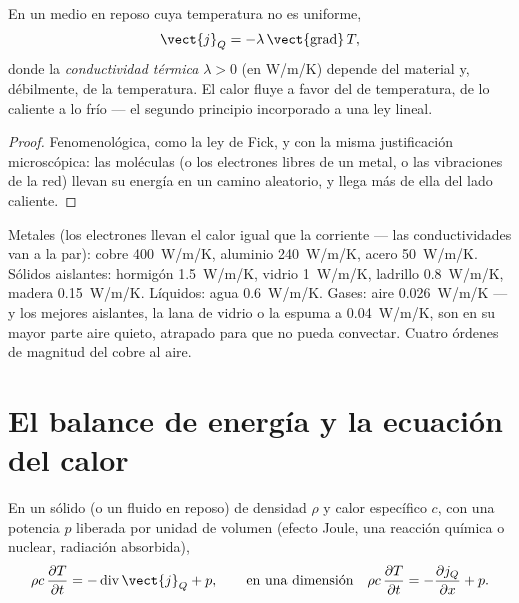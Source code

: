 \begin{theorem}\label{thm:b2:heat-conduction:fourier}
En un medio en reposo cuya temperatura no es uniforme,
\[
\vect{j}_Q = -\lambda\,\vect{\operatorname{grad}}\,T ,
\]
donde la \emph{conductividad térmica}
$\lambda > 0$ (en \unit{W/m/K}) depende del material y, débilmente, de
la temperatura. El calor fluye a favor del  de temperatura, de lo caliente a lo
frío --- el segundo principio incorporado a una ley lineal.
\end{theorem}

\begin{proof}
Fenomenológica, como la ley de Fick, y con la misma justificación
microscópica: las moléculas (o los electrones libres de un metal, o las
vibraciones de la red) llevan su energía en un camino aleatorio, y llega más
de ella del lado caliente.
\end{proof}

\begin{example}[Conductividades]\label{ex:b2:heat-conduction:values}
Metales (los electrones llevan el calor igual que la corriente ---
las conductividades van a la par): cobre \qty{400}{W/m/K}, aluminio
\qty{240}{W/m/K}, acero \qty{50}{W/m/K}. Sólidos aislantes: hormigón
\qty{1.5}{W/m/K}, vidrio \qty{1}{W/m/K}, ladrillo \qty{0.8}{W/m/K}, madera
\qty{0.15}{W/m/K}. Líquidos: agua \qty{0.6}{W/m/K}. Gases: aire
\qty{0.026}{W/m/K} --- y los mejores aislantes, la lana de vidrio o la espuma a
\qty{0.04}{W/m/K}, son en su mayor parte aire quieto, atrapado para que no
pueda convectar. Cuatro órdenes de magnitud del cobre al aire.
\end{example}

\section{El balance de energía y la ecuación del calor}

\begin{theorem}\label{thm:b2:heat-conduction:balance}
En un sólido (o un fluido en reposo) de densidad $\rho$ y calor específico
$c$, con una potencia $p$ liberada por unidad de volumen (efecto Joule, una
reacción química o nuclear, radiación absorbida),
\[
\rho c\,\frac{\partial T}{\partial t} = -\operatorname{div}\vect{j}_Q + p ,
\qquad\text{en una dimensión}\quad
\rho c\,\frac{\partial T}{\partial t} = -\frac{\partial j_Q}{\partial x} + p .
\]
\end{theorem}

